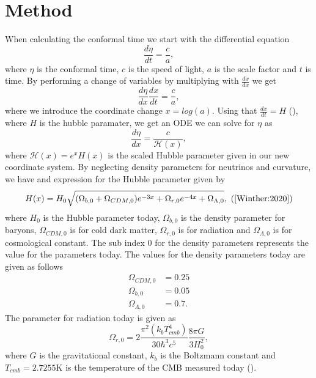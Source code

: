 \documentclass[onecolumn]{aastex62}
\begin{document}
\section{Method} \label{sec:method}
When calculating the conformal time we start with the differential equation
\begin{equation}
    \frac{d\eta}{dt} = \frac{c}{a},
\end{equation}
where $\eta$ is the conformal time, $c$ is the speed of light, $a$ is the scale
factor and $t$ is time. By performing a change of variables by multiplying with
$\frac{dx}{dx}$ we get
\begin{equation}
    \frac{d\eta}{dx}\frac{dx}{dt} = \frac{c}{a},
\end{equation}
where we introduce the coordinate change $x=log(a)$. Using that
$\frac{dx}{dt}=H$ (\cite{callin2006calculate}), where $H$ is the hubble
paramater, we get an ODE we can solve for $\eta$ as
\begin{equation}\label{eq:eta_of_x}
    \frac{d\eta}{dx} = \frac{c}{\mathcal{H}(x)},
\end{equation}
where $\mathcal{H}(x)=e^xH(x)$ is the scaled Hubble parameter given in our new coordinate system. By neglecting density parameters for neutrinos
and curvature, we have and expression for the Hubble parameter given by
\begin{equation}\label{eq:H_of_x}
    H(x) = H_0\sqrt{(\Omega_{b,0} + \Omega_{CDM,0})e^{-3x} + \Omega_{r,0} e^{-4x} + \Omega_{\Lambda,0}}, \text{ (\cite{Winther:2020})}
\end{equation} 
where $H_0$ is the Hubble parameter today, $\Omega_{b,0}$ is the density parameter for baryons,
$\Omega_{CDM,0}$ is for cold dark matter, $\Omega_{r,0}$ is for radiation and
$\Omega_{\Lambda,0}$ is for cosmological constant. The sub index $0$ for the
density parameters represents
the value for the parameters today. The values for the density parameters today
are given as follows
\begin{align}
    \Omega_{CDM,0} &=0.25\\
    \Omega_{b,0} &=0.05\\
    \Omega_{\Lambda,0} &=0.7.
\end{align}
The parameter for radiation today is given as 
\begin{equation}
    \Omega_{r,0} =2\frac{\pi^2(k_bT_{cmb}^4)}{30\hbar^3c^5}\frac{8\pi G}{3H_0^2},
\end{equation}
where $G$ is the gravitational constant, $k_b$ is the Boltzmann constant and
$T_{cmb} =2.7255$K is the temperature of the CMB measured today (\cite{Winther:2020}).
 
\end{document}
